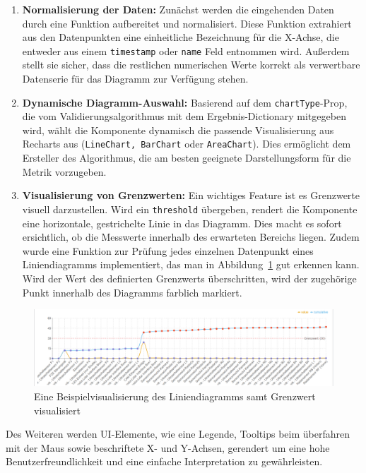 \begin{enumerate}
  \item \textbf{Normalisierung der Daten:} Zunächst werden die eingehenden Daten durch eine Funktion aufbereitet und normalisiert. Diese Funktion extrahiert aus den Datenpunkten eine einheitliche Bezeichnung für die X-Achse, die entweder aus einem \texttt{timestamp} oder \texttt{name} Feld entnommen wird. Außerdem stellt sie sicher, dass die restlichen numerischen Werte korrekt als verwertbare Datenserie für das Diagramm zur Verfügung stehen.
  \item \textbf{Dynamische Diagramm-Auswahl:} Basierend auf dem \texttt{chartType}-Prop, die vom Validierungsalgorithmus mit dem Ergebnis-Dictionary mitgegeben wird, wählt die Komponente dynamisch die passende Visualisierung aus Recharts aus (\texttt{LineChart, BarChart} oder \texttt{AreaChart}). Dies ermöglicht dem Ersteller des Algorithmus, die am besten geeignete Darstellungsform für die Metrik vorzugeben.
  \item \textbf{Visualisierung von Grenzwerten:} Ein wichtiges Feature ist es Grenzwerte visuell darzustellen. Wird ein \texttt{threshold} übergeben, rendert die Komponente eine horizontale, gestrichelte Linie in das Diagramm. Dies macht es sofort ersichtlich, ob die Messwerte innerhalb des erwarteten Bereichs liegen. Zudem wurde eine Funktion zur Prüfung jedes einzelnen Datenpunkt eines Liniendiagramms implementiert, das man in Abbildung~\ref{fig:Liniendiagramm} gut erkennen kann. Wird der Wert des definierten Grenzwerts überschritten, wird der zugehörige Punkt innerhalb des Diagramms farblich markiert.
\end{enumerate}

\begin{figure}[h!]
  \centering
  \includegraphics[width=\textwidth]{figures/06Evaluation/Line.png}
  \caption{Eine Beispielvisualisierung des Liniendiagramms samt Grenzwert visualisiert}
  \label{fig:Liniendiagramm}
\end{figure}

Des Weiteren werden UI-Elemente, wie eine Legende, Tooltips beim überfahren mit der Maus sowie beschriftete X- und Y-Achsen, gerendert um eine hohe Benutzerfreundlichkeit und eine einfache Interpretation zu gewährleisten.

